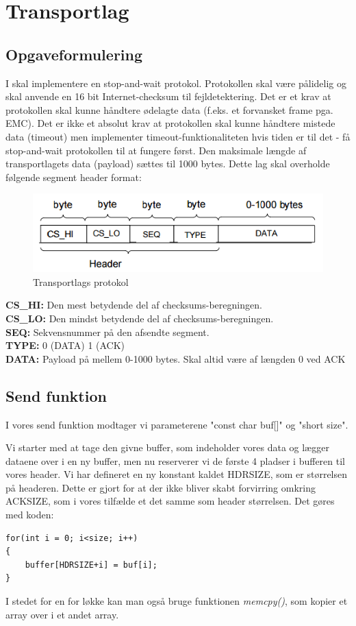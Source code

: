 \chapter{Transportlag}

\section{Opgaveformulering}
I skal implementere en stop-and-wait protokol. Protokollen skal være pålidelig og skal anvende en 16 bit Internet-checksum til
fejldetektering. Det er et krav at protokollen skal kunne håndtere ødelagte data (f.eks. et forvansket frame pga. EMC). Det er ikke et absolut krav at protokollen skal kunne håndtere mistede data (timeout) men implementer timeout-funktionaliteten hvis tiden er til det - få stop-and-wait protokollen til at fungere først. Den maksimale længde af transportlagets data (payload) sættes til 1000 bytes. Dette lag skal overholde følgende segment header format:

\begin{figure}[htbp]
\centering
\includegraphics[width=1\linewidth]{Subpages/Billeder/Transportlag}
\caption{Transportlags protokol}
\label{fig:Transportlag}
\end{figure}

\textbf{CS\_HI:} Den mest betydende del af checksums-beregningen.\\
\textbf{CS\_LO:} Den mindst betydende del af checksums-beregningen.\\
\textbf{SEQ:} Sekvensnummer på den afsendte segment.\\
\textbf{TYPE:} 0 (DATA) 1 (ACK)\\
\textbf{DATA:} Payload på mellem 0-1000 bytes. Skal altid være af længden 0 ved ACK


\section{Send funktion}
I vores send funktion modtager vi parameterene "const char buf[]" og "short size". 

Vi starter med at tage den givne buffer, som indeholder vores data og lægger dataene over i en ny buffer, men nu reserverer vi de første 4 pladser i bufferen til vores header. 
Vi har defineret en ny konstant kaldet HDRSIZE, som er størrelsen på headeren. Dette er gjort for at der ikke bliver skabt forvirring omkring ACKSIZE, som i vores tilfælde et det samme som header størrelsen. 
Det gøres med koden:
\begin{lstlisting}
for(int i = 0; i<size; i++)
{
	buffer[HDRSIZE+i] = buf[i];
}
\end{lstlisting}
I stedet for en for løkke kan man også bruge funktionen \textit{memcpy()}, som kopier et array over i et andet array.


